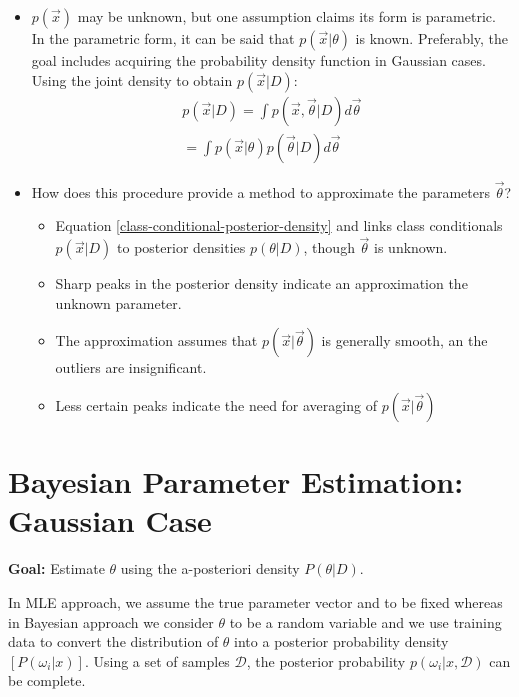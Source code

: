 \documentclass[11pt]{article}
\begin{document}
\begin{itemize}
\begin{itemize}
\begin{itemize}
		\end{itemize}
	\end{itemize}
	\item $p(\vec{x})$ may be unknown, but one assumption claims its form is parametric.  In the parametric form, it can be said that  $p(\vec{x}| \theta)$ is known.   Preferably, the goal includes acquiring the probability density function in Gaussian cases.  Using the joint density to obtain $p(\vec{x} | D)$: 
	\begin{eqnarray}
		p( \vec{x} | D) = \int p( \vec{x} , \vec{\theta} | D ) d \vec{\theta} \\
		= \int p( \vec{x} | \theta) p( \vec{\theta} | D) d \vec{\theta} \label{class-conditional-posterior-density}
	\end{eqnarray}
	\item How does this procedure provide a method to approximate the parameters $\vec{\theta}$?
	 \cite[92]{duda-hart-stork}
	\begin{itemize}
		\item Equation \ref{class-conditional-posterior-density} and  links class conditionals $p(\vec{x} | D)$ to posterior densities $p(\theta |D)$, though $\vec{\theta}$ is unknown. 
		\item Sharp peaks in the posterior density indicate an approximation the unknown parameter. 
		\item The approximation assumes that $p(\vec{x}| \vec{\theta})$ is generally smooth, an the outliers are insignificant.  
		\item Less certain peaks indicate the need for averaging of $p(\vec{x}| \vec{\theta})$
	\end{itemize}	
\end{itemize}

\section{Bayesian Parameter Estimation: Gaussian Case}
\textbf{Goal:} Estimate $\theta$ using the a-posteriori density $P(\theta | D)$.


In MLE approach, we assume the true parameter vector and to be fixed whereas in Bayesian approach we consider $\theta$ to be a random variable and we use training data to convert the distribution of $\theta$ into a posterior probability density $[P(\omega_i | x)]$.  Using a set of samples $\mathcal{D}$, the posterior probability $p(\omega_i | x, \mathcal{D})$ can be complete.
\end{document}
